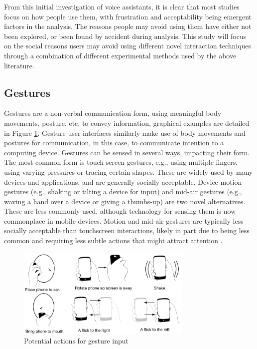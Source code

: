 \documentclass{l4proj}
\begin{document}
From this initial investigation of voice assistants, it is clear that most studies focus on how people use them, with frustration and acceptability being emergent factors in the analysis. The reasons people may avoid using them have either not been explored, or been found by accident during analysis. This study will focus on the social reasons users may avoid using different novel interaction techniques through a combination of different experimental methods used by the above literature.

\subsection{Gestures}

Gestures are a non-verbal communication form, using meaningful body movements, posture, etc, to convey information, graphical examples are detailed in Figure \ref{fig:Gesture}. Gesture user interfaces similarly make use of body movements and postures for communication, in this case, to communicate intention to a computing device. Gestures can be sensed in several ways, impacting their form. The most common form is touch screen gestures, e.g., using multiple fingers, using varying pressures or tracing certain shapes. These are widely used by many devices and applications, and are generally socially acceptable. Device motion gestures (e.g., shaking or tilting a device for input) and mid-air gestures (e.g., waving a hand over a device or giving a thumbs-up) are two novel alternatives. These are less commonly used, although technology for sensing them is now commonplace in mobile devices. Motion and mid-air gestures are typically less socially acceptable than touchscreen interactions, likely in part due to being less common and requiring less subtle actions that might attract attention \citep{rico_usable_2010}.

\begin{figure}[!htb]
    \centering
    \includegraphics[width=0.75\textwidth]{images/gestures.png}
        \caption{Potential actions for gesture input}
        \label{fig:Gesture}
\end{figure}
\end{document}
